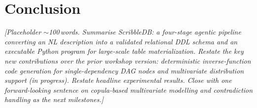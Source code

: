 \section{Conclusion}

\textit{[Placeholder $\sim$100\,words. Summarise ScribbleDB: a four-stage agentic pipeline
converting an NL description into a validated relational DDL schema and an executable Python
program for large-scale table materialization.
Restate the key new contributions over the prior workshop version: deterministic
inverse-function code generation for single-dependency DAG nodes and multivariate distribution
support (in progress).
Restate headline experimental results.
Close with one forward-looking sentence on copula-based multivariate modelling and
contradiction handling as the next milestones.]}

